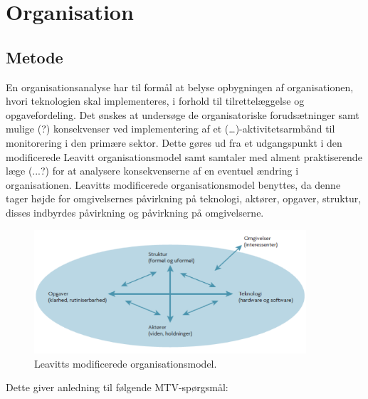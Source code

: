 \chapter{Organisation}
\section{Metode}
En organisationsanalyse har til formål at belyse opbygningen af organisationen, hvori teknologien skal implementeres, i forhold til tilrettelæggelse og opgavefordeling. 
Det ønskes at undersøge de organisatoriske forudsætninger samt mulige (?) konsekvenser ved implementering af et (…)-aktivitetsarmbånd til monitorering i den primære sektor. Dette gøres ud fra et udgangspunkt i den modificerede Leavitt organisationsmodel samt samtaler med alment praktiserende læge (...?) for at analysere konsekvenserne af en eventuel ændring i organisationen. Leavitts modificerede organisationsmodel benyttes, da denne tager højde for omgivelsernes påvirkning på teknologi, aktører, opgaver, struktur, disses indbyrdes påvirkning og påvirkning på omgivelserne.

\begin{figure}[H]
\centering
\includegraphics[width=0.9\textwidth]{figures/leavitt}
\caption{Leavitts modificerede organisationsmodel.}
\label{fig:leavittmodel}
\end{figure}

Dette giver anledning til følgende MTV-spørgsmål:

